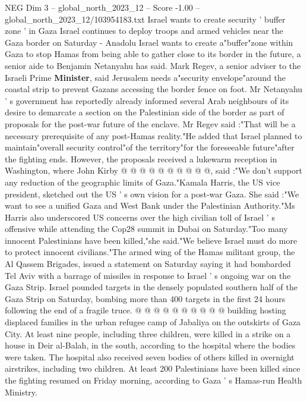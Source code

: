 \begin{textsample}{NEG Dim 3 – global\_north\_2023\_12 – Score -1.00 – global\_north\_2023\_12/103954183.txt}  \label{ex:f3_neg_234}
Israel wants to create security ' buffer zone ' in Gaza Israel continues to deploy troops and armed vehicles near the Gaza border on Saturday - Anadolu Israel wants to create a"buffer"zone within Gaza to stop Hamas from being able to gather close to its border in the future, a senior aide to Benjamin Netanyahu has said.
Mark Regev, a senior adviser to the Israeli Prime \textbf{Minister}, said Jerusalem needs a"security envelope"around the coastal strip to prevent Gazans accessing the border fence on foot.
Mr Netanyahu ' s government has reportedly already informed several Arab neighbours of its desire to demarcate a section on the Palestinian side of the border as part of proposals for the post-war future of the enclave.
Mr Regev said :"That will be a necessary prerequisite of any post-Hamas reality."He added that Israel planned to maintain"overall security control"of the territory"for the foreseeable future"after the fighting ends.
However, the proposals received a lukewarm reception in Washington, where John Kirby @ @ @ @ @ @ @ @ @ @, said :"We don't support any reduction of the geographic limits of Gaza."Kamala Harris, the US vice president, sketched out the US ' s own vision for a post-war Gaza.
She said :"We want to see a unified Gaza and West Bank under the Palestinian Authority."Ms Harris also underscored US concerns over the high civilian toll of Israel ' s offensive while attending the Cop28 summit in Dubai on Saturday."Too many innocent Palestinians have been killed,"she said."We believe Israel must do more to protect innocent civilians."The armed wing of the Hamas militant group, the Al Qassem Brigades, issued a statement on Saturday saying it had bombarded Tel Aviv with a barrage of missiles in response to Israel ' s ongoing war on the Gaza Strip.
Israel pounded targets in the densely populated southern half of the Gaza Strip on Saturday, bombing more than 400 targets in the first 24 hours following the end of a fragile truce. @ @ @ @ @ @ @ @ @ @ building hosting displaced families in the urban refugee camp of Jabaliya on the outskirts of Gaza City.
At least nine people, including three children, were killed in a strike on a house in Deir al-Balah, in the south, according to the hospital where the bodies were taken.
The hospital also received seven bodies of others killed in overnight airstrikes, including two children.
At least 200 Palestinians have been killed since the fighting resumed on Friday morning, according to Gaza ' s Hamas-run Health Ministry.

\end{textsample}
